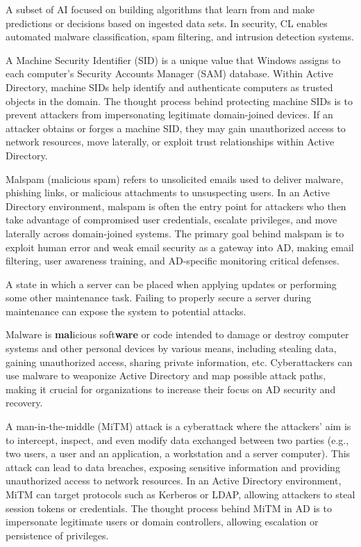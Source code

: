  A subset of AI focused on building algorithms that learn from and make predictions or decisions based on ingested data sets. In security, CL enables automated malware classification, spam filtering, and intrusion detection systems.

 A Machine Security Identifier (SID) is a unique value that Windows assigns to each computer’s Security Accounts Manager (SAM) database. Within Active Directory, machine SIDs help identify and authenticate computers as trusted objects in the domain. The thought process behind protecting machine SIDs is to prevent attackers from impersonating legitimate domain-joined devices. If an attacker obtains or forges a machine SID, they may gain unauthorized access to network resources, move laterally, or exploit trust relationships within Active Directory.

 Malspam (malicious spam) refers to unsolicited emails used to deliver malware, phishing links, or malicious attachments to unsuspecting users. In an Active Directory environment, malspam is often the entry point for attackers who then take advantage of compromised user credentials, escalate privileges, and move laterally across domain-joined systems. The primary goal behind malspam is to exploit human error and weak email security as a gateway into AD, making email filtering, user awareness training, and AD-specific monitoring critical defenses.

 A state in which a server can be placed when applying updates or performing some other maintenance task. Failing to properly secure a server during maintenance can expose the system to potential attacks.

 Malware is \textbf{mal}icious soft\textbf{ware} or code intended to damage or destroy computer systems and other personal devices by various means, including stealing data, gaining unauthorized access, sharing private information, etc. Cyberattackers can use malware to weaponize Active Directory and map possible attack paths, making it crucial for organizations to increase their focus on AD security and recovery. 

 A man-in-the-middle (MiTM) attack is a cyberattack where the attackers' aim is to intercept, inspect, and even modify data exchanged between two parties (e.g., two users, a user and an application, a workstation and a server computer). This attack can lead to data breaches, exposing sensitive information and providing unauthorized access to network resources. In an Active Directory environment, MiTM can target protocols such as Kerberos or LDAP, allowing attackers to steal session tokens or credentials. The thought process behind MiTM in AD is to impersonate legitimate users or domain controllers, allowing escalation or persistence of privileges.

